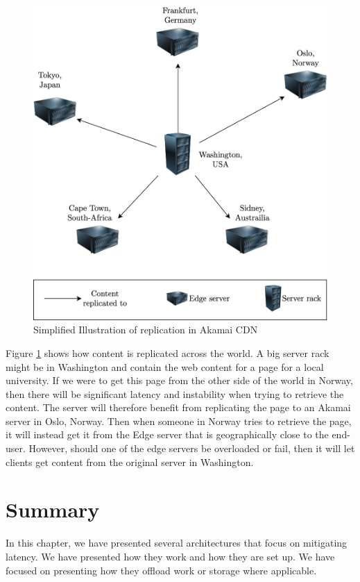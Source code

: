 \begin{figure}[t]
    \centering
    \includegraphics[scale=0.8]{chapters/4_architectures/figures/akamai_dist.png}
    \caption{Simplified Illustration of replication in Akamai CDN}
    \label{fig:Akamai_cdn}
\end{figure}

Figure \ref{fig:Akamai_cdn} shows how content is replicated across the world. A big server rack might be in Washington and contain the web content for a page for a local university. If we were to get this page from the other side of the world in Norway, then there will be significant latency and instability when trying to retrieve the content. The server will therefore benefit from replicating the page to an Akamai server in Oslo, Norway. Then when someone in Norway tries to retrieve the page, it will instead get it from the Edge server that is geographically close to the end-user. However, should one of the edge servers be overloaded or fail, then it will let clients get content from the original server in Washington. 




\section{Summary}
In this chapter, we have presented several architectures that focus on mitigating latency. We have presented how they work and how they are set up. We have focused on presenting how they offload work or storage where applicable. 